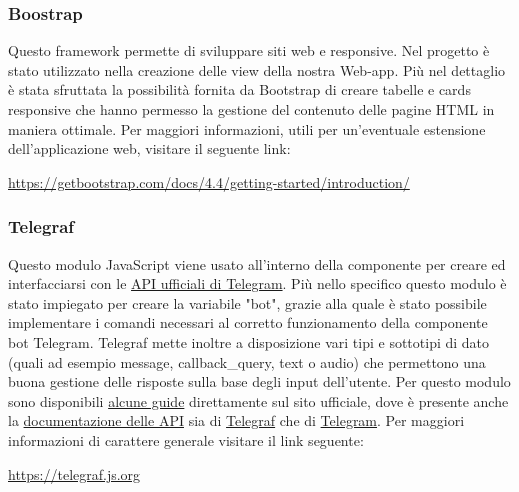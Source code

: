 		\subsubsection{Boostrap}
			Questo framework permette di sviluppare siti web e  responsive. Nel progetto è stato utilizzato nella creazione delle view della nostra Web-app.
			Più nel dettaglio è stata sfruttata la possibilità fornita da Bootstrap di creare tabelle e cards responsive che hanno permesso la gestione del contenuto delle pagine HTML in maniera ottimale.
			\newline
			Per maggiori informazioni, utili per un'eventuale estensione dell'applicazione web, visitare il seguente link:
			\newline
			\begin{center}
				\url{https://getbootstrap.com/docs/4.4/getting-started/introduction/}
			\end{center}	
		\subsubsection{Telegraf}
			Questo modulo JavaScript viene usato all'interno della componente  per creare ed interfacciarsi con le \href{https://core.telegram.org/bots/api}{API ufficiali di Telegram}.
			Più nello specifico questo modulo è stato impiegato per creare la variabile "bot", grazie alla quale è stato possibile implementare i comandi necessari al corretto funzionamento della componente bot Telegram.
			Telegraf mette inoltre a disposizione vari tipi e sottotipi di dato (quali ad esempio message, callback\_query, text o audio) che permettono una buona gestione delle risposte sulla base degli input dell'utente. Per questo modulo sono disponibili \href{https://telegraf.js.org/#/?id=getting-started}{alcune guide} direttamente sul sito ufficiale, dove è presente anche la \href{https://telegraf.js.org/#/?id=api-reference}{documentazione delle API} sia di \href{https://telegraf.js.org/#/?id=telegraf}{Telegraf} che di \href{https://telegraf.js.org/#/?id=telegram}{Telegram}.
			\newline
			Per maggiori informazioni di carattere generale visitare il link seguente:
			\newline
			\begin{center}
				\url{https://telegraf.js.org}
			\end{center}
	